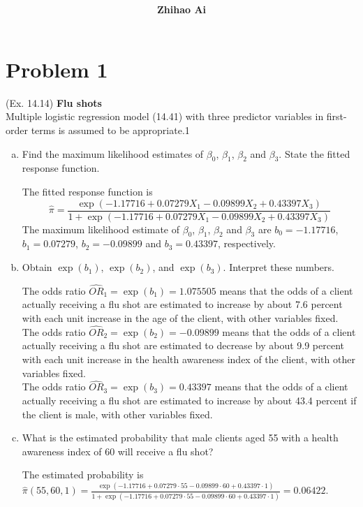 \documentclass[10pt]{report}
\title{
	\vspace{2in}
	\textmd{\textbf{\hwCourse\\\hwTitle}}\\
	\vspace{0.3in}\large{\textit{\hmClassInstructor}}
	\vspace{3in}
}
\author{\textbf{Zhihao Ai}}
\date{}
\begin{document}
\maketitle

\section*{Problem 1}
(Ex. 14.14) \textbf{Flu shots}\\
Multiple logistic regression model (14.41) with three predictor variables in first-order terms is assumed to be appropriate.1
\begin{enumerate}[a.]
	\item 
	Find the maximum likelihood estimates of $\beta_0$, $\beta_1$, $\beta_2$ and $\beta_3$. State the fitted response function.
	
	The fitted response function is 
	\[
	\hat{\pi} = \frac{\exp(-1.17716 + 0.07279 X_1 - 0.09899 X_2 + 0.43397 X_3)}{1 + \exp(-1.17716 + 0.07279 X_1 - 0.09899 X_2 + 0.43397 X_3)}
	\]
	The maximum likelihood estimate of $\beta_0$, $\beta_1$, $\beta_2$ and $\beta_3$ are $b_0 = -1.17716$, $b_1 = 0.07279$, $b_2 = -0.09899$ and $b_3 = 0.43397$, respectively.
	
	\item 
	Obtain $\exp(b_1)$, $\exp(b_2)$, and $\exp(b_3)$. Interpret these numbers.
	
	The odds ratio $\widehat{OR}_1 = \exp(b_1) = 1.075505$ means that the odds of a client actually receiving a flu shot are estimated to increase by about 7.6 percent with each unit increase in the age of the client, with other variables fixed.\\
	The odds ratio $\widehat{OR}_2 = \exp(b_2) = -0.09899$ means that the odds of a client actually receiving a flu shot are estimated to decrease by about 9.9 percent with each unit increase in the health awareness index of the client, with other variables fixed.\\
	The odds ratio $\widehat{OR}_3 = \exp(b_3) = 0.43397$ means that the odds of a client actually receiving a flu shot are estimated to increase by about 43.4 percent if the client is male, with other variables fixed.
	
	\item 
	What is the estimated probability that male clients aged 55 with a health awareness index of 60 will receive a flu shot?
	
	The estimated probability is $\hat{\pi}(55, 60, 1) = \frac{\exp(-1.17716 + 0.07279\cdot 55 - 0.09899\cdot 60 + 0.43397\cdot 1)}{1 + \exp(-1.17716 + 0.07279\cdot 55 - 0.09899\cdot 60 + 0.43397\cdot 1)} = 0.06422$.
\end{enumerate}
\end{document}
